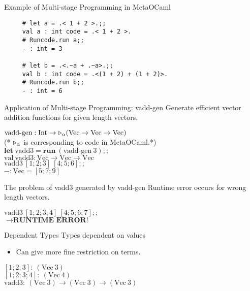 \documentclass[dvipdfmx,aspectratio=169, 20pt]{beamer}
\begin{document}
\begin{frame}[fragile]{Example of Multi-stage Programming in MetaOCaml}
    \begin{center}
        \begin{verbatim}
     # let a = .< 1 + 2 >.;;
     val a : int code = .< 1 + 2 >.
     # Runcode.run a;;
     - : int = 3

     # let b = .<.~a + .~a>.;;
     val b : int code = .<(1 + 2) + (1 + 2)>. 
     # Runcode.run b;;
     - : int = 6
        \end{verbatim}
    \end{center}
    \note{
    }
\end{frame}

\begin{frame}[fragile]{Application of Multi-stage Programming: vadd-gen}
    Generate efficient vector addition functions for given length vectors.
    \renewcommand{\V}{\text{Vec}}
    \begin{tabbing}
        \( \text{vadd-gen} : \I \to \TW_\alpha (\V \to \V \to \V) \) \\
        (* \( {\mathop{\triangleright}}_\alpha \) is corresponding to code in MetaOCaml.*) \\[2mm]
        \( \textbf{let}\ \text{vadd3} = \textbf{run}\ (\text{vadd-gen}\ 3);; \) \\
        \( \text{val}\ \text{vadd3} : \V \to \V \to \V \) \\[2mm]
        \( \text{vadd3}\ [1;2;3]\ [4;5;6];; \) \\
        \( - : \V = [5;7;9] \)
    \end{tabbing}
    \note{
    }
\end{frame}

\begin{frame}[fragile]{The problem of vadd3 generated by vadd-gen}
    Runtime error occurs for wrong length vectors.
    \renewcommand{\V}{\text{Vec}}
    \begin{tabbing}
        \( \text{vadd3}\ [1;2;3;4]\ [4;5;6;7];; \) \\
        \( \longrightarrow \textbf{RUNTIME ERROR!} \)
    \end{tabbing}
    \note{
    }
\end{frame}

\begin{frame}[fragile]{Dependent Types}
    Types dependent on values
    \begin{itemize}
            \item Can give more fine restriction on terms.
    \end{itemize}
    \renewcommand{\V}{\text{Vec}\ }
    \begin{tabbing}
        \( [1;2;3]:\ (\V 3) \) \\
        \( [1;2;3;4]:\ (\V 4) \) \\
        \( \text{vadd3}:\ (\V 3) \to (\V 3) \to (\V 3) \)
    \end{tabbing}

\end{frame}
\end{document}
